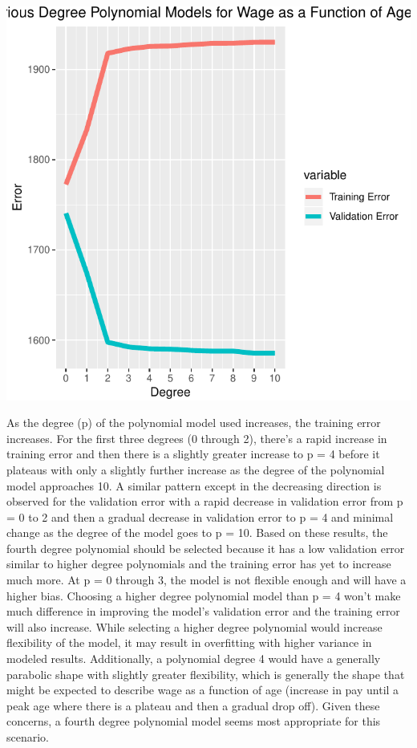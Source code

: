 \documentclass[]{article}
\begin{document}
\begin{center}\includegraphics{homework1-handout_files/figure-latex/unnamed-chunk-15-1} \end{center}

As the degree (p) of the polynomial model used increases, the training
error increases. For the first three degrees (0 through 2), there's a
rapid increase in training error and then there is a slightly greater
increase to p = 4 before it plateaus with only a slightly further
increase as the degree of the polynomial model approaches 10. A similar
pattern except in the decreasing direction is observed for the
validation error with a rapid decrease in validation error from p = 0 to
2 and then a gradual decrease in validation error to p = 4 and minimal
change as the degree of the model goes to p = 10. Based on these
results, the fourth degree polynomial should be selected because it has
a low validation error similar to higher degree polynomials and the
training error has yet to increase much more. At p = 0 through 3, the
model is not flexible enough and will have a higher bias. Choosing a
higher degree polynomial model than p = 4 won't make much difference in
improving the model's validation error and the training error will also
increase. While selecting a higher degree polynomial would increase
flexibility of the model, it may result in overfitting with higher
variance in modeled results. Additionally, a polynomial degree 4 would
have a generally parabolic shape with slightly greater flexibility,
which is generally the shape that might be expected to describe wage as
a function of age (increase in pay until a peak age where there is a
plateau and then a gradual drop off). Given these concerns, a fourth
degree polynomial model seems most appropriate for this scenario.
\end{document}

